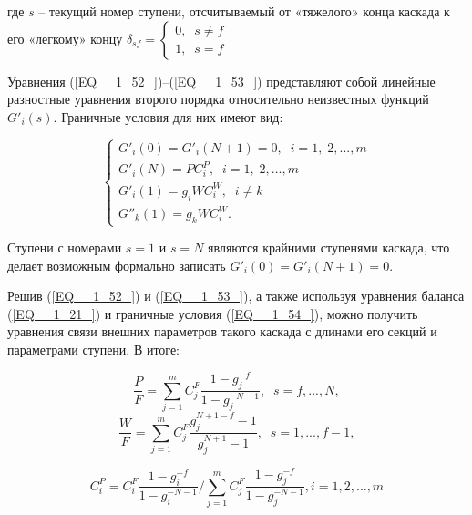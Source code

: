 где $s$ – текущий номер ступени, отсчитываемый от «тяжелого» конца каскада к его «легкому» концу $\delta _{sf} =\left\{\begin{array}{l} {0,\; \; s\ne f} \\ {1,\; \; s=f} \end{array}\right. $

Уравнения (\ref{EQ__1_52_})--(\ref{EQ__1_53_}) представляют собой линейные разностные уравнения второго порядка относительно неизвестных функций $G'_{i} (s)$. Граничные условия для них имеют вид:

\begin{equation} \label{EQ__1_54_} 
  \left\{\begin{array}{l} {G'_{i} (0)=G'_{i} (N+1)=0,\; \; i=1,\; 2,...,m} \\ {G'_{i} (N)=PC_{i}^{P} ,\; \; i=1,\; 2,...,m} \\ {G'_{i} (1)=g_{i} WC_{i}^{W} ,\; \; i\ne k} \\ {G''_{k} (1)=g_{k} WC_{i}^{W} .} \end{array}\right.  
\end{equation} 

Ступени с номерами $s=1$ и $s=N$ являются крайними ступенями каскада, что делает возможным формально записать $G'_{i} (0)=G'_{i} (N+1)=0$.

Решив (\ref{EQ__1_52_}) и (\ref{EQ__1_53_}), а также используя уравнения баланса (\ref{EQ__1_21_}) и граничные условия (\ref{EQ__1_54_}), можно получить уравнения связи внешних параметров такого каскада с длинами его секций и параметрами ступени. В итоге:

\begin{equation} \label{EQ__1_55_} 
  \frac{P}{F} =\sum _{j=1}^{m}C_{j}^{F} \frac{1-g_{j}^{-f} }{1-g_{j}^{-N-1}} ,\; \; s=f,...,N ,                                                  
  \end{equation} 
  \begin{equation} \label{EQ__1_56_} 
  \frac{W}{F} =\sum _{j=1}^{m}C_{j}^{F} \frac{g_{j}^{N+1-f} -1}{g_{j}^{N+1} -1} ,\; \; s=1,...,f-1 ,                                            
\end{equation}

\begin{equation} \label{EQ__1_57_} 
  C_{i}^{P}=C_{i}^{F} \frac{1-g_{i}^{-f}}{1-g_{i}^{-N-1}} / \sum_{j=1}^{m} C_{j}^{F} \frac{1-g_{j}^{-f}}{1-g_{j}^{-N-1}}, i=1,2, \ldots, m                             
\end{equation}

